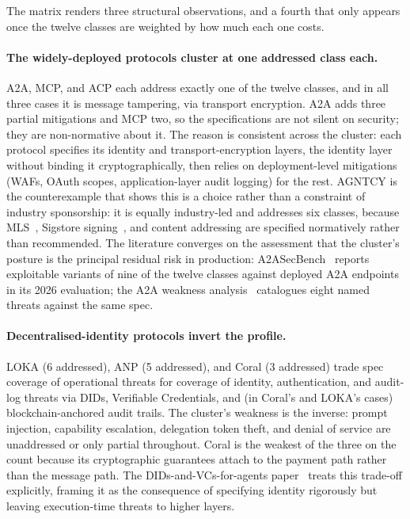 

The matrix renders three structural observations, and a
fourth that only appears once the twelve classes are
weighted by how much each one costs.

\paragraph{The widely-deployed protocols cluster at one
addressed class each.}
A2A, MCP, and ACP each address exactly one of the twelve
classes, and in all three cases it is message tampering, via
transport encryption. A2A adds three partial mitigations and
MCP two, so the specifications are not silent on security;
they are non-normative about it. The reason is consistent
across the cluster: each protocol
specifies its identity and transport-encryption layers,
the identity layer without binding it cryptographically,
then relies on deployment-level mitigations
(WAFs, OAuth scopes, application-layer audit logging) for
the rest. AGNTCY is the counterexample that shows this is a
choice rather than a constraint of industry sponsorship: it
is equally industry-led and addresses six classes, because
MLS~\cite{rfc9420}, Sigstore signing~\cite{sigstore2022}, and
content addressing are specified
normatively rather than recommended. The literature
converges on the assessment that
the cluster's posture is the principal residual risk in
production: A2ASecBench~\cite{a2asecbench} reports
exploitable variants of nine of the twelve classes against
deployed A2A endpoints in its 2026 evaluation; the A2A
weakness analysis~\cite{a2a_weaknesses} catalogues eight
named threats against the same spec.

\paragraph{Decentralised-identity protocols invert the
profile.}
LOKA (6 addressed), ANP (5 addressed), and Coral (3
addressed) trade spec coverage of operational
threats for coverage of identity, authentication, and
audit-log threats via DIDs, Verifiable Credentials, and (in
Coral's and LOKA's cases) blockchain-anchored audit
trails. The cluster's weakness is the inverse: prompt
injection, capability escalation, delegation token theft,
and denial of service are unaddressed or only partial
throughout. Coral is the weakest of the three on the count
because its cryptographic guarantees attach to the payment
path rather than the message path. The
DIDs-and-VCs-for-agents paper~\cite{did_vc_agents} treats
this trade-off explicitly, framing it as the consequence of
specifying identity rigorously but leaving execution-time
threats to higher layers.

